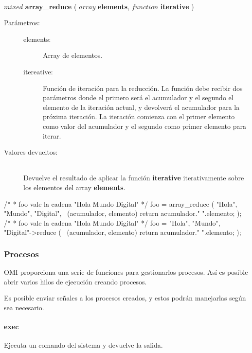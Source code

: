 \begin{framed}
\hfill \\ $mixed$ \textbf{array\_reduce} ( $array$ \textbf{elements}, $function$ \textbf{iterative} )  
\begin{description}
\item [Parámetros:] \hfill 
   \begin{description}
   \item[elements:] Array de elementos.
   \item[itereative:] Función de iteración para la reducción. La función debe recibir dos parámetros donde el primero
   será el acumulador y el segundo el elemento de la iteración actual, y devolverá el acumulador para la próxima iteración.
   La iteración comienza con el primer elemento como valor del acumulador y el segundo como primer elemento para iterar.
   \end{description}
\item[Valores devueltos:] \hfill \\
   Devuelve el resultado de aplicar la función \textbf{iterative} iterativamente sobre los elementos del array \textbf{elements}.
\end{description}
\end{framed}
     
\begin{myverbatim}   
   /*
    * foo vale la cadena "Hola Mundo Digital"
    */
   foo = array_reduce (
      {"Hola", "Mundo", "Digital"}, 
      ~(acumulador, elemento) { 
         return acumulador." ".elemento;
      }
   ); 
   /*
    * foo vale la cadena "Hola Mundo Digital"
    */
   foo = {"Hola", "Mundo", "Digital"}->reduce (
      ~(acumulador, elemento) { 
         return acumulador." ".elemento;
      }
   );
\end{myverbatim}

\subsubsection{Procesos}
OMI proporciona una serie de funciones para gestionarlos procesos. Así es posible abrir varios
hilos de ejecución creando procesos.

Es posible enviar señales a los procesos creados, y estos podrán manejarlas según sea necesario. 

\paragraph{exec}
Ejecuta un comando del sistema y devuelve la salida.

